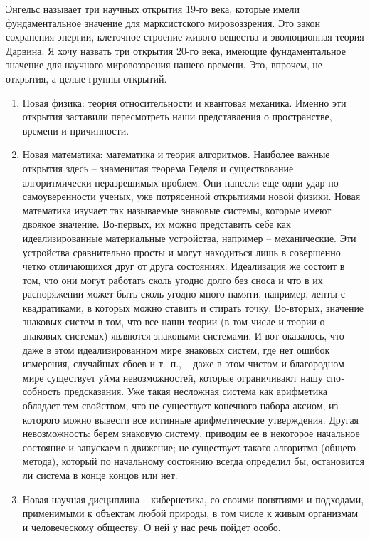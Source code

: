 \documentclass{book}
\begin{document}
Энгельс называет три научных открытия 19-го века, которые имели фундаментальное значение для марксистского мировоззрения. Это закон сохранения энергии, клеточное строение живого вещества и эволюционная теория Дарвина. Я хочу назвать три открытия 20-го века, имеющие фундаментальное значение для научного мировоззрения нашего времени. Это, впрочем, не открытия, а целые группы открытий.
\begin{enumerate}
 \item Новая физика: теория относительности и квантовая механика. Именно эти открытия заставили пересмотреть наши представления о пространстве, времени и причинности.
 \item Новая математика: математика и теория алгоритмов. Наиболее важные открытия здесь -- знаменитая теорема Геделя и существование алгоритмически неразрешимых проблем. Они нанесли еще одни удар по самоуверенности ученых, уже потрясенной открытиями новой физики. Новая математика изучает так называемые знаковые системы,  которые имеют двоякое значение. Во-первых, их можно представить себе как идеализированные материальные устройства, например -- механи­ческие. Эти устройства сравнительно просты и могут находить­ся лишь в совершенно четко отличающихся друг от друга состояниях. Идеализация же состоит в том, что они могут работать сколь угодно долго без сноса и что в их распоряжении может быть сколь угодно много памяти,  например, ленты с квадрати­ками, в которых можно ставить и стирать точку. Во-вторых, значение знаковых систем в том, что все наши теории (в том числе и теории о знаковых системах) являются знаковыми системами. И вот оказалось, что даже в этом идеализированном мире знаковых систем, где нет 
ошибок измерения, случайных сбоев и т.~п., -- даже в этом чистом и благородном мире сущест­вует уйма невозможностей, которые ограничивают нашу спо­собность предсказания. Уже такая несложная система как ариф­метика обладает тем свойством, что не существует конечного набора аксиом, из которого можно вывести все истинные арифметические утверждения. Другая невозможность: берем знако­вую систему, приводим ее в некоторое начальное состояние и запускаем в движение; не существует такого алгоритма (об­щего метода), который по начальному состоянию всегда опре­делил бы, остановится ли система в конце концов или нет.
 \item Новая научная дисциплина -- кибернетика, со своими поня­тиями и подходами, применимыми к объектам любой природы, в том числе к живым организмам и человеческому обществу. О ней у нас речь пойдет особо.
\end{enumerate}
\end{document}
